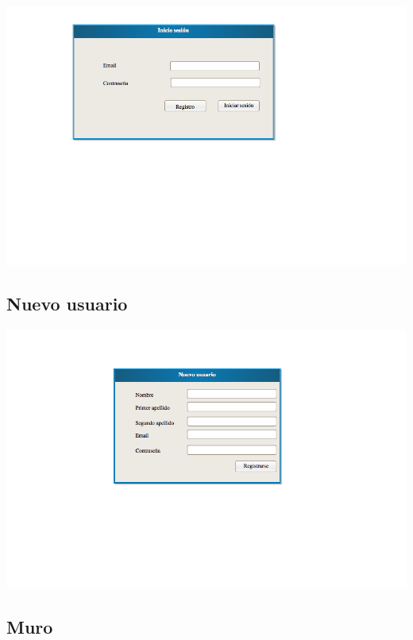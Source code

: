 \documentclass[12pt, a4paper, titlepage]{article}
\begin{document}
\begin{center}
	
	\includegraphics[scale=0.7]{Imagenes/Ventana_inicio_sesion.png}
	
\end{center}

\subsection{Nuevo usuario}

\begin{center}
	
	\includegraphics[scale=0.7]{Imagenes/registro.png}
	
\end{center}

\subsection{Muro}
\end{document}
